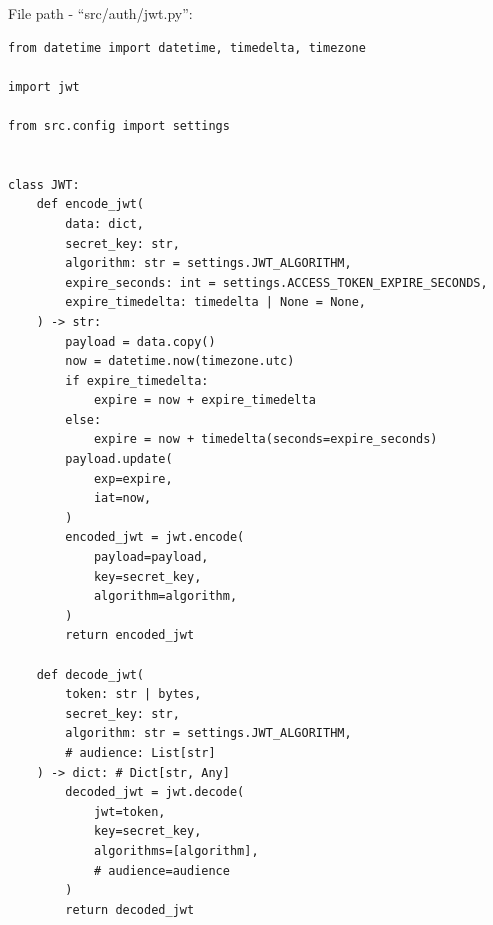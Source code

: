 File path - ``src/auth/jwt.py'':
\begin{lstlisting}
from datetime import datetime, timedelta, timezone

import jwt

from src.config import settings


class JWT:
    def encode_jwt(
        data: dict,
        secret_key: str,
        algorithm: str = settings.JWT_ALGORITHM,
        expire_seconds: int = settings.ACCESS_TOKEN_EXPIRE_SECONDS,
        expire_timedelta: timedelta | None = None,
    ) -> str:
        payload = data.copy()
        now = datetime.now(timezone.utc)
        if expire_timedelta:
            expire = now + expire_timedelta
        else:
            expire = now + timedelta(seconds=expire_seconds)
        payload.update(
            exp=expire,
            iat=now,
        )
        encoded_jwt = jwt.encode(
            payload=payload,
            key=secret_key,
            algorithm=algorithm,
        )
        return encoded_jwt

    def decode_jwt(
        token: str | bytes,
        secret_key: str,
        algorithm: str = settings.JWT_ALGORITHM,
        # audience: List[str]
    ) -> dict: # Dict[str, Any]
        decoded_jwt = jwt.decode(
            jwt=token,
            key=secret_key,
            algorithms=[algorithm],
            # audience=audience
        )
        return decoded_jwt
\end{lstlisting}

\clearpage

